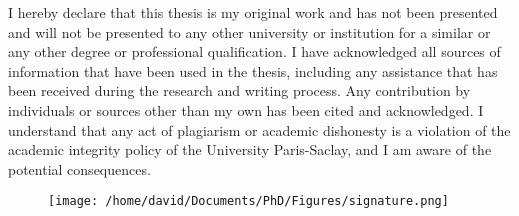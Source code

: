I hereby declare that this thesis is my original work and has not been presented and will not be presented to any other university or institution for a similar or any other degree or professional qualification.
I have acknowledged all sources of information that have been used in the thesis, including any assistance that has been received during the research and writing process.
Any contribution by individuals or sources other than my own has been cited and acknowledged.
I understand that any act of plagiarism or academic dishonesty is a violation of the academic integrity policy of the University Paris-Saclay, and I am aware of the potential consequences.

\begin{figure}[!htb]
    \centering
    \texttt{[image: /home/david/Documents/PhD/Figures/signature.png]}
\end{figure}
